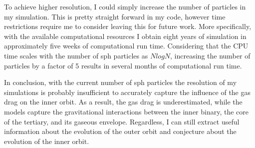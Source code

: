 To achieve higher resolution, I could simply increase the number of particles in my simulation. This is pretty straight forward in my code, however time restrictions require me to consider leaving this for future work. More specifically, with the available computational resources I obtain eight years of simulation in approximately five weeks of computational run time. Considering that the CPU time scales with the number of \ac{sph} particles as $NlogN$, increasing the number of particles by a factor of 5 results in several months of computational run time. 

In conclusion, with the current number of \ac{sph} particles the resolution of my simulations is probably insufficient to accurately capture the influence of the gas drag on the inner orbit. As a result, the gas drag is underestimated, while the models capture the gravitational interactions between the inner binary, the core of the tertiary, and its gaseous envelope. Regardless, I can still extract useful information about the evolution of the outer orbit and conjecture about the evolution of the inner orbit. 